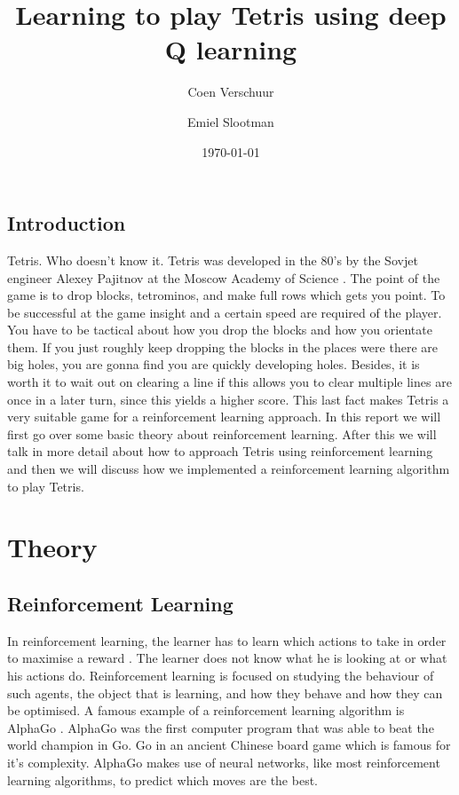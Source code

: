 \documentclass{report}
\title{Learning to play Tetris using deep Q learning}
\author{Coen Verschuur \and Emiel Slootman}
\date{\today}
\begin{document}
\maketitle


\section{Introduction}
Tetris. Who doesn't know it. Tetris was developed in the 80's by the Sovjet engineer Alexey Pajitnov at the Moscow Academy of Science \cite{tet}. The point of the game is to drop blocks, tetrominos, and make full rows which gets you point. To be successful at the game insight and a certain speed are required of the player. You have to be tactical about how you drop the blocks and how you orientate them. If you just roughly keep dropping the blocks in the places were there are big holes, you are gonna find you are quickly developing holes. Besides, it is worth it to wait out on clearing a line if this allows you to clear multiple lines are once in a later turn, since this yields a higher score. This last fact makes Tetris a very suitable game for a reinforcement learning approach.
In this report we will first go over some basic theory about reinforcement learning. After this we will talk in more detail about how to approach Tetris using reinforcement learning and then we will discuss how we implemented a reinforcement learning algorithm to play Tetris.

\tableofcontents

\chapter{Theory}
\section{Reinforcement Learning \label{sec:RL}}
In reinforcement learning, the learner has to learn which actions to take in order to maximise a reward \cite[1]{Sutton2018}. The learner does not know what he is looking at or what his actions do. Reinforcement learning is focused on studying the behaviour of such agents, the object that is learning, and how they behave and how they can be optimised. A famous example of a reinforcement learning algorithm is AlphaGo \cite{alphago}. AlphaGo was the first computer program that was able to beat the world champion in Go. Go in an ancient Chinese board game which is famous for it's complexity. AlphaGo makes use of neural networks, like most reinforcement learning algorithms, to predict which moves are the best.
\end{document}
